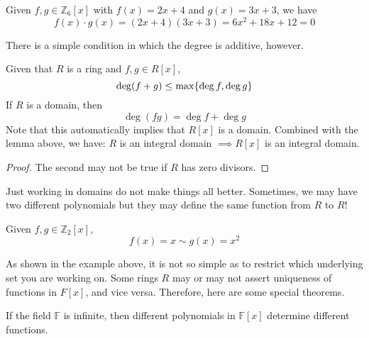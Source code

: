   \begin{example}
    Given $f, g \in \mathbb{Z}_6 [x]$ with $f(x) = 2x + 4$ and $g(x) = 3x + 3$, we have 
    \begin{equation}
      f(x) \cdot g(x) = (2x + 4)(3x + 3) = 6x^2 + 18 x + 12 = 0
    \end{equation}
  \end{example}

  There is a simple condition in which the degree is additive, however. 

  \begin{theorem}
    Given that $R$ is a ring and $f, g \in R[x]$, 
    \begin{equation}
      \deg(f+g) \leq \max\{\deg f, \deg g\} \\
    \end{equation}
    If $R$ is a domain, then 
    \begin{equation}
      \deg (f g) = \deg f + \deg g
    \end{equation}
    Note that this automatically implies that $R[x]$ is a domain. Combined with the lemma above, we have: $R$ is an integral domain $\implies R[x]$ is an integral domain. 
  \end{theorem}
  \begin{proof}
    The second may not be true if $R$ has zero divisors. 
  \end{proof}

  Just working in domains do not make things all better. Sometimes, we may have two different polynomials but they may define the same function from $R$ to $R$! 

  \begin{example}
    Given $f, g \in \mathbb{Z}_2 [x]$, 
    \begin{equation}
      f(x) = x \sim g(x) = x^2
    \end{equation} 
  \end{example}

  As shown in the example above, it is not so simple as to restrict which underlying set you are working on. Some rings $R$ may or may not assert uniqueness of functions in $F[x]$, and vice versa. Therefore, here are some special theorems. 

  \begin{theorem}
    If the field $\mathbb{F}$ is infinite, then different polynomials in $\mathbb{F}[x]$ determine different functions. 
  \end{theorem}

